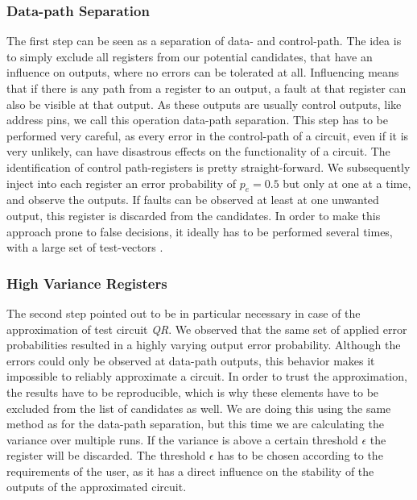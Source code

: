 \documentclass[conference]{IEEEtran}
\begin{document}
\subsubsection{Data-path Separation}
The first step can be seen as a separation of data- and control-path. The idea is to simply exclude all registers from our potential candidates, that have an influence on outputs, where no errors can be tolerated at all. Influencing means that if there is any path from a register to an output, a fault at that register can also be visible at that output. As these outputs are usually control outputs, like address pins, we call this operation data-path separation. This step has to be performed very careful, as every error in the control-path of a circuit, even if it is very unlikely, can have disastrous effects on the functionality of a circuit. The identification of control path-registers is pretty straight-forward. We subsequently inject into each register an error probability of $p_e=0.5$ but only at one at a time, and observe the outputs. If faults can be observed at least at one unwanted output, this register is discarded from the candidates. In order to make this approach prone to false decisions, it ideally has to be performed several times, with a large set of test-vectors \cite{may2014improving}.
\subsubsection{High Variance Registers}
\label{subsubsec:high_v}
The second step pointed out to be in particular necessary in case of the approximation of test circuit \emph{QR}. We observed that the same set of applied error probabilities resulted in a highly varying output error probability. Although the errors could only be observed at data-path outputs, this behavior makes it impossible to reliably approximate a circuit. In order to trust the approximation, the results have to be reproducible, which is why these elements have to be excluded from the list of candidates as well. We are doing this using the same method as for the data-path separation, but this time we are calculating the variance over multiple runs. If the variance is above a certain threshold $\epsilon$ the register will be discarded. The threshold $\epsilon$ has to be chosen according to the requirements of the user, as it has a direct influence on the stability of the outputs of the approximated circuit.
\end{document}

